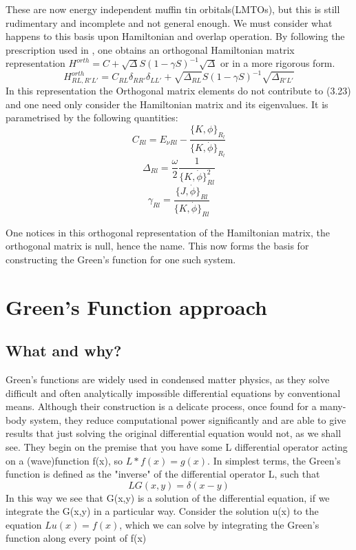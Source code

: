 \documentclass[12pt]{article}
\begin{document}
These are now energy independent muffin tin orbitals(LMTOs), but this is still rudimentary and incomplete and not general enough. We must consider what happens to this basis upon Hamiltonian and overlap operation. By following the prescription used in \cite{turek}, one obtains an orthogonal Hamiltonian matrix representation $H^{orth}=C + \sqrt{\Delta}S(1-\gamma S)^{-1} \sqrt{\Delta}$ or in a more rigorous form\cite{drchal}.
\begin{equation} \label{3.20} \tag{3.30}
H^{orth}_{RL,R'L'}=C_{RL}\delta_{RR'}\delta_{LL'} + \sqrt{\Delta_{RL}}S(1-\gamma S)^{-1} \sqrt{\Delta_{R'L'}}
\end{equation}
In this representation the Orthogonal matrix elements do not contribute to (3.23) and one need only consider the Hamiltonian matrix and its eigenvalues. It is parametrised by the following quantities: 
$$C_{Rl}=E_{\nu Rl}-\frac{\{K,\phi\}_R_l}{\{K,\dot{\phi}\}_R_l}$$
$$\Delta_{Rl}=\frac{\omega}{2} \frac{1}{\{K,\dot{\phi}\}^2_{Rl}}$$
$$\gamma_{Rl}=\frac{\{J,\dot{\phi}\}_{Rl}}{\{K,\dot{\phi}\}_{Rl}}$$

One notices in this orthogonal representation of the Hamiltonian matrix, the orthogonal matrix is null, hence the name. This now forms the basis for constructing the Green's function for one such system. 

\section{Green's Function approach}
\subsection{What and why?}

Green's functions are widely used in condensed matter physics, as they solve difficult and often analytically impossible differential equations by conventional means. Although their construction is a delicate process, once found for a many-body system, they reduce computational power significantly and are able to give results that just solving the original differential equation would not, as we shall see. They begin on the premise that you have some L differential operator acting on a (wave)function f(x), so $L*f(x)=g(x)$. In simplest terms, the Green's function is defined as the "inverse" of the differential operator L, such that 
$$LG(x,y)=\delta (x-y)$$
In this way we see that G(x,y) is a solution of the differential equation, if we integrate the G(x,y) in a particular way. Consider the solution u(x) to the equation $Lu(x)=f(x)$, which we can solve by integrating the Green's function along every point of f(x)
\end{document}
